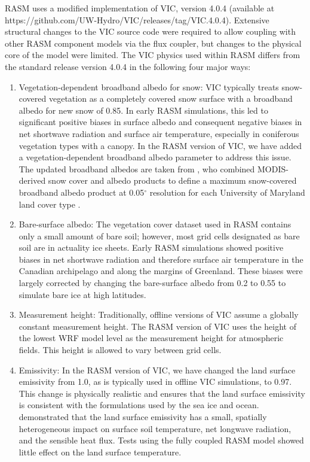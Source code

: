 RASM uses a modified implementation of VIC, version 4.0.4 (available at \\
https://github.com/UW-Hydro/VIC/releases/tag/VIC.4.0.4).
Extensive structural changes to the VIC source code were required to allow coupling with other RASM component models via the flux coupler, but changes to the physical core of the model were limited.
The VIC physics used within RASM differs from the standard release version 4.0.4 in the following four major ways:

\begin{enumerate}
  \item Vegetation-dependent broadband albedo for snow: VIC typically treats snow-covered vegetation as a completely covered snow surface with a broadband albedo for new snow of 0.85. In early RASM simulations, this led to significant positive biases in surface albedo and consequent negative biases in net shortwave radiation and surface air temperature, especially in coniferous vegetation types with a canopy. In the RASM version of VIC, we have added a vegetation-dependent broadband albedo parameter to address this issue. The updated broadband albedos are taken from \citet{Barlage_2005}, who combined MODIS-derived snow cover and albedo products to define a maximum snow-covered broadband albedo product at 0.05$^{\circ}$ resolution for each University of Maryland land cover type \citep{Hansen_2000}.
  \item Bare-surface albedo: The vegetation cover dataset used in RASM contains only a small amount of bare soil; however, most grid cells designated as bare soil are in actuality ice sheets. Early RASM simulations showed positive biases in net shortwave radiation and therefore surface air temperature in the Canadian archipelago and along the margins of Greenland. These biases were largely corrected by changing the bare-surface albedo from 0.2 to 0.55 to simulate bare ice at high latitudes.
  \item Measurement height: Traditionally, offline versions of VIC assume a globally constant measurement height. The RASM version of VIC uses the height of the lowest WRF model level as the measurement height for atmospheric fields. This height is allowed to vary between grid cells.
  \item Emissivity: In the RASM version of VIC, we have changed the land surface emissivity from 1.0, as is typically used in offline VIC simulations, to 0.97. This change is physically realistic  and ensures that the land surface emissivity is \citep{Prabhakara_1976} consistent with the formulations used by the sea ice and ocean. \citet{Jin_2006} demonstrated that the land surface emissivity has a small, spatially heterogeneous impact on surface soil temperature, net longwave radiation, and the sensible heat flux. Tests using the fully coupled RASM model showed little effect on the land surface temperature.
\end{enumerate}

